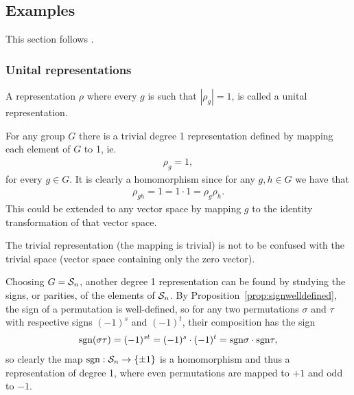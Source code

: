 \subsection{Examples}\label{sect:basicreprs}

This section follows \cite[1.?]{Serre}.

\subsubsection{Unital representations}

	A representation $\rho$ where every $g$ is such that $|\rho_g| = 1$, is called a unital representation.

\begin{example}
	For any group $G$ there is a trivial degree 1 representation defined by mapping each element of $G$ to 1, ie.
	\begin{align*}
		\rho_g = 1,
	\end{align*}
	for every $g \in G$. It is clearly a homomorphism since for any $g,h \in G$ we have that
	\begin{align*}
		\rho_{gh} = 1 = 1 \cdot 1 = \rho_g \rho_h.
	\end{align*}
	This could be extended to any vector space by mapping $g$ to the identity transformation of that vector space.
\end{example}

\begin{note}
	The trivial representation (the mapping is trivial) is not to be confused with the trivial space (vector space containing only the zero vector).
\end{note}

\begin{example}
	Choosing $G = \mathcal{S}_n$, another degree 1 representation can be found by studying the signs, or parities, of the elements of $\mathcal{S}_n$. By Proposition~\ref{prop:signwelldefined}, the sign of a permutation is well-defined, so for any two permutations $\sigma$ and $\tau$ with respective signs $(-1)^s$ and $(-1)^t$, their composition has the sign
	\begin{align*}
		\text{sgn}(\sigma\tau) = (-1)^{st} = (-1)^s \cdot (-1)^t = \text{sgn}\sigma \cdot \text{sgn} \tau,
	\end{align*}
	so clearly the map $\text{sgn}: \mathcal{S}_n \rightarrow \{\pm 1\}$ is a homomorphism and thus a representation of degree 1, where even permutations are mapped to $+1$ and odd to $-1$.
\end{example}

